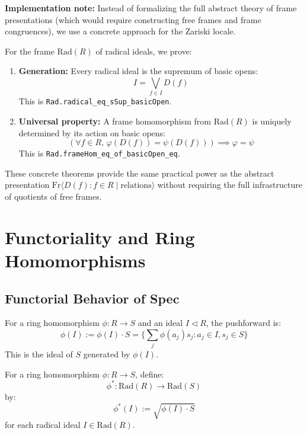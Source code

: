 \begin{remark}
  \label{remark:concrete-approach}
  \textbf{Implementation note:} Instead of formalizing the full abstract theory of frame presentations
  (which would require constructing free frames and frame congruences), we use a concrete approach
  for the Zariski locale.

  For the frame $\mathrm{Rad}(R)$ of radical ideals, we prove:
  \begin{enumerate}
    \item \textbf{Generation:} Every radical ideal is the supremum of basic opens:
          $$I = \bigvee_{f \in I} D(f)$$
          This is \texttt{Rad.radical\_eq\_sSup\_basicOpen}.

    \item \textbf{Universal property:} A frame homomorphism from $\mathrm{Rad}(R)$ is uniquely
          determined by its action on basic opens:
          $$(\forall f \in R,\, \varphi(D(f)) = \psi(D(f))) \implies \varphi = \psi$$
          This is \texttt{Rad.frameHom\_eq\_of\_basicOpen\_eq}.
  \end{enumerate}

  These concrete theorems provide the same practical power as the abstract presentation
  $\mathrm{Fr}\langle D(f) : f \in R \mid \text{relations} \rangle$ without requiring the
  full infrastructure of quotients of free frames.
\end{remark}



\chapter{Functoriality and Ring Homomorphisms}

\section{Functorial Behavior of Spec}

\begin{definition}
  \label{def:pushforward-ideals}
  \leanok
  For a ring homomorphism $\phi: R \to S$ and an ideal $I \triangleleft R$, the pushforward is:
  $$\phi(I) := \phi(I) \cdot S = \{\sum_j \phi(a_j) s_j : a_j \in I, s_j \in S\}$$
  This is the ideal of $S$ generated by $\phi(I)$.
\end{definition}

\begin{definition}
  \label{def:induced-frame-homomorphism}
  \leanok
  For a ring homomorphism $\phi: R \to S$, define:
  $$\phi^*: \mathrm{Rad}(R) \to \mathrm{Rad}(S)$$
  by:
  $$\phi^*(I) := \sqrt{\phi(I) \cdot S}$$
  for each radical ideal $I \in \mathrm{Rad}(R)$.
\end{definition}

